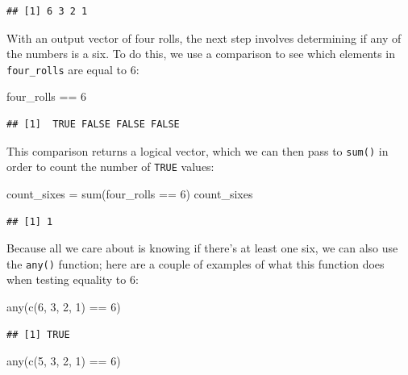 \documentclass[
]{book}
\newenvironment{Shaded}{\begin{snugshade}}{\end{snugshade}}
\newcommand{\DecValTok}[1]{\textcolor[rgb]{0.00,0.00,0.81}{#1}}
\newcommand{\FunctionTok}[1]{\textcolor[rgb]{0.00,0.00,0.00}{#1}}
\newcommand{\NormalTok}[1]{#1}
\newcommand{\OtherTok}[1]{\textcolor[rgb]{0.56,0.35,0.01}{#1}}
\newcommand{\SpecialCharTok}[1]{\textcolor[rgb]{0.00,0.00,0.00}{#1}}
\begin{document}
\begin{verbatim}
## [1] 6 3 2 1
\end{verbatim}

With an output vector of four rolls, the next step involves determining if
any of the numbers is a six. To do this, we use a comparison to see which
elements in \texttt{four\_rolls} are equal to 6:

\begin{Shaded}
\begin{Highlighting}[]
\NormalTok{four\_rolls }\SpecialCharTok{==} \DecValTok{6}
\end{Highlighting}
\end{Shaded}

\begin{verbatim}
## [1]  TRUE FALSE FALSE FALSE
\end{verbatim}

This comparison returns a logical vector, which we can then pass to \texttt{sum()}
in order to count the number of \texttt{TRUE} values:

\begin{Shaded}
\begin{Highlighting}[]
\NormalTok{count\_sixes }\OtherTok{=} \FunctionTok{sum}\NormalTok{(four\_rolls }\SpecialCharTok{==} \DecValTok{6}\NormalTok{)}
\NormalTok{count\_sixes}
\end{Highlighting}
\end{Shaded}

\begin{verbatim}
## [1] 1
\end{verbatim}

Because all we care about is knowing if there's at least one six, we can also
use the \texttt{any()} function; here are a couple of examples of what this function
does when testing equality to 6:

\begin{Shaded}
\begin{Highlighting}[]
\FunctionTok{any}\NormalTok{(}\FunctionTok{c}\NormalTok{(}\DecValTok{6}\NormalTok{, }\DecValTok{3}\NormalTok{, }\DecValTok{2}\NormalTok{, }\DecValTok{1}\NormalTok{) }\SpecialCharTok{==} \DecValTok{6}\NormalTok{)}
\end{Highlighting}
\end{Shaded}

\begin{verbatim}
## [1] TRUE
\end{verbatim}

\begin{Shaded}
\begin{Highlighting}[]
\FunctionTok{any}\NormalTok{(}\FunctionTok{c}\NormalTok{(}\DecValTok{5}\NormalTok{, }\DecValTok{3}\NormalTok{, }\DecValTok{2}\NormalTok{, }\DecValTok{1}\NormalTok{) }\SpecialCharTok{==} \DecValTok{6}\NormalTok{)}
\end{Highlighting}
\end{Shaded}
\end{document}

